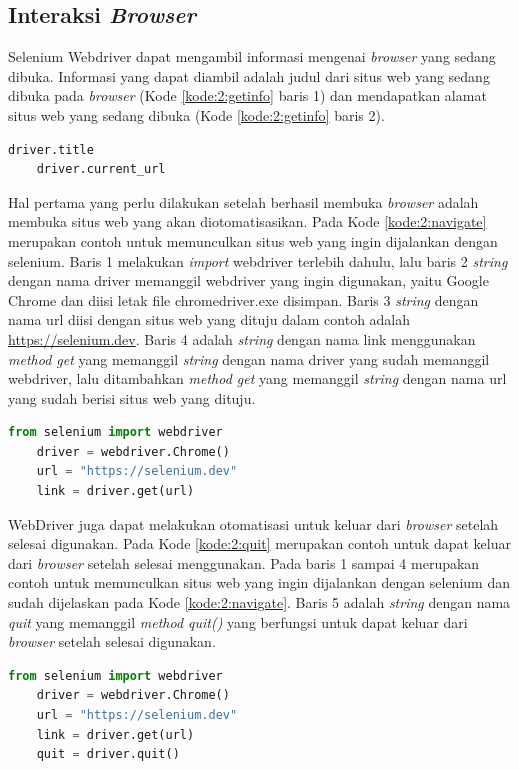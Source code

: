 \subsection{Interaksi \textit{Browser}}
Selenium Webdriver dapat mengambil informasi mengenai \textit{browser} yang sedang dibuka. Informasi yang dapat diambil adalah judul dari situs web yang sedang dibuka pada \textit{browser} (Kode \ref{kode:2:getinfo} baris 1) dan mendapatkan alamat situs web yang sedang dibuka (Kode \ref{kode:2:getinfo} baris 2). 
\begin{lstlisting}[language=python, caption=Contoh Potongan Kode \textit{Get Title} dan \textit{Get Current URL}, label=kode:2:getinfo]
	driver.title
	driver.current_url
\end{lstlisting}
Hal pertama yang perlu dilakukan setelah berhasil membuka \textit{browser} adalah membuka situs web yang akan diotomatisasikan. Pada Kode \ref{kode:2:navigate} merupakan contoh untuk memunculkan situs web yang ingin dijalankan dengan selenium. Baris 1 melakukan \textit{import} webdriver terlebih dahulu, lalu baris 2 \textit{string} dengan nama driver memanggil webdriver yang ingin digunakan, yaitu Google Chrome dan diisi letak file chromedriver.exe disimpan. Baris 3 \textit{string} dengan nama url diisi dengan situs web yang dituju dalam contoh adalah \url{https://selenium.dev}. Baris 4 adalah \textit{string} dengan nama link menggunakan \textit{method get} yang memanggil \textit{string} dengan nama driver yang sudah memanggil webdriver, lalu ditambahkan \textit{method get} yang memanggil \textit{string} dengan nama url yang sudah berisi situs web yang dituju.
\begin{lstlisting}[language=python, caption=Contoh kode Navigate to, label=kode:2:navigate]
	from selenium import webdriver
	driver = webdriver.Chrome()
	url = "https://selenium.dev"
	link = driver.get(url)
\end{lstlisting}
WebDriver juga dapat melakukan otomatisasi untuk keluar dari \textit{browser} setelah selesai digunakan. Pada Kode \ref{kode:2:quit} merupakan contoh untuk dapat keluar dari \textit{browser} setelah selesai menggunakan. Pada baris 1 sampai 4 merupakan contoh untuk memunculkan situs web yang ingin dijalankan dengan selenium dan sudah dijelaskan pada Kode \ref{kode:2:navigate}. Baris 5 adalah \textit{string} dengan nama \textit{quit} yang memanggil \textit{method quit()} yang berfungsi untuk dapat keluar dari \textit{browser} setelah selesai digunakan.
\newpage
\begin{lstlisting}[language=python, caption=Contoh kode Get title, label=kode:2:quit]
	from selenium import webdriver
	driver = webdriver.Chrome()
	url = "https://selenium.dev"
	link = driver.get(url)
	quit = driver.quit()
\end{lstlisting}

